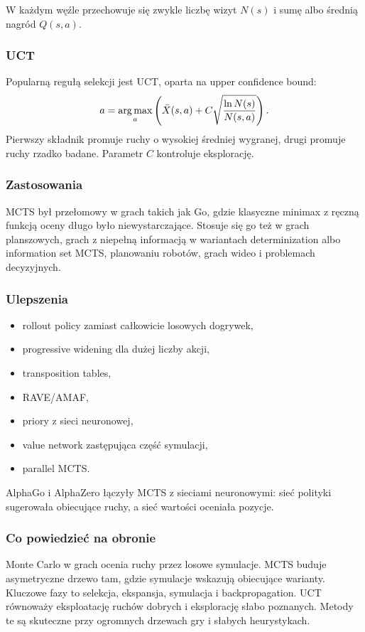 W każdym węźle przechowuje się zwykle liczbę wizyt $N(s)$ i sumę albo średnią nagród $Q(s,a)$.

\subsubsection{UCT}

Popularną regułą selekcji jest UCT, oparta na upper confidence bound:
\[
a=\operatorname*{arg\,max}_a\left(\bar X(s,a)+C\sqrt{\frac{\ln N(s)}{N(s,a)}}\right).
\]
Pierwszy składnik promuje ruchy o wysokiej średniej wygranej, drugi promuje ruchy rzadko badane. Parametr $C$ kontroluje eksplorację.

\subsubsection{Zastosowania}

MCTS był przełomowy w grach takich jak Go, gdzie klasyczne minimax z ręczną funkcją oceny długo było niewystarczające. Stosuje się go też w grach planszowych, grach z niepełną informacją w wariantach determinization albo information set MCTS, planowaniu robotów, grach wideo i problemach decyzyjnych.

\subsubsection{Ulepszenia}

\begin{itemize}
  \item rollout policy zamiast całkowicie losowych dogrywek,
  \item progressive widening dla dużej liczby akcji,
  \item transposition tables,
  \item RAVE/AMAF,
  \item priory z sieci neuronowej,
  \item value network zastępująca część symulacji,
  \item parallel MCTS.
\end{itemize}

AlphaGo i AlphaZero łączyły MCTS z sieciami neuronowymi: sieć polityki sugerowała obiecujące ruchy, a sieć wartości oceniała pozycje.

\subsubsection{Co powiedzieć na obronie}

Monte Carlo w grach ocenia ruchy przez losowe symulacje. MCTS buduje asymetryczne drzewo tam, gdzie symulacje wskazują obiecujące warianty. Kluczowe fazy to selekcja, ekspansja, symulacja i backpropagation. UCT równoważy eksploatację ruchów dobrych i eksplorację słabo poznanych. Metody te są skuteczne przy ogromnych drzewach gry i słabych heurystykach.

